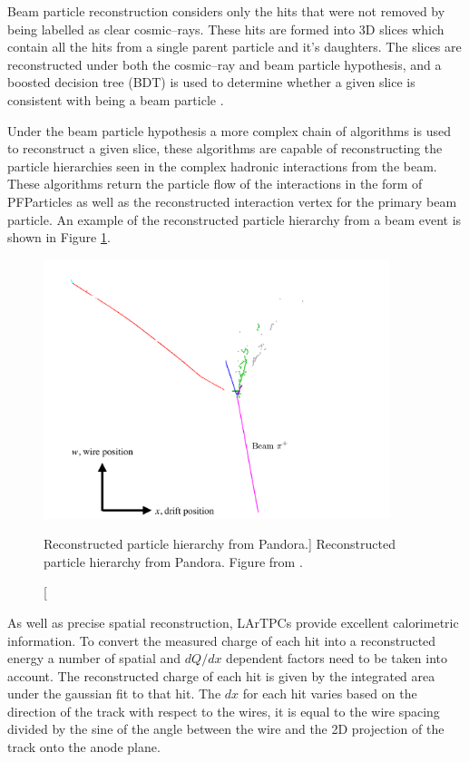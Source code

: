 Beam particle reconstruction considers only the hits that were not removed by 
being labelled as clear cosmic--rays. These hits are formed into 3D slices which
contain all the hits from a single parent particle and it's daughters. The
slices are reconstructed under both the cosmic--ray and beam particle
hypothesis, and a boosted decision tree (BDT) is used to determine whether a 
given slice is consistent with being a beam particle \cite{TODO}. 

Under the beam particle hypothesis a more complex chain of algorithms is used to
reconstruct a given slice, these algorithms are capable of reconstructing the
particle hierarchies seen in the complex hadronic interactions from the
\protodune{} beam. These algorithms return the particle flow of the interactions
in the form of PFParticles as well as the reconstructed interaction vertex for
the primary beam particle. An example of the reconstructed particle hierarchy
from a \protodune{} beam event is shown in Figure \ref{fig:pandora_pfp}.

\begin{figure}

	\centering

	\includegraphics[width=0.9\textwidth]{figures/pandoraEvent.pdf}

	\caption
	[Reconstructed particle hierarchy from Pandora.]
	{Reconstructed particle hierarchy from Pandora. Figure from
	\cite{protoduneperf}.}

	\label{fig:pandora_pfp}

\end{figure}

As well as precise spatial reconstruction, LArTPCs provide excellent
calorimetric information. To convert the measured charge of each hit into a
reconstructed energy a number of spatial and $dQ/dx$ dependent factors need to
be taken into account. The reconstructed charge of each hit is given by the
integrated area under the gaussian fit to that hit. The $dx$ for each hit varies
based on the direction of the track with respect to the wires, it is equal to
the wire spacing divided by the sine of the angle between the wire and the 2D
projection of the track onto the anode plane.

